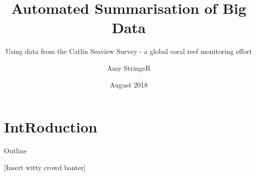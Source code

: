 \documentclass{beamer}
\title{Automated Summarisation of Big Data}
\subtitle{Using data from the Catlin Seaview Survey - a global coral reef monitoring effort}
\author{Amy StringeR}
\institute[Global Change Institute]
{
  \inst{1}%
  University of Queensland
}
\date{August 2018}
\begin{document}
    \section{IntRoduction}
        \begin{frame}
          \titlepage
        \end{frame}

        \begin{frame}{Outline}
          \tableofcontents
        \end{frame}

        \begin{frame}
          \begin{block}{[Insert witty crowd banter]}
          \end{block}
        \end{frame}

\end{document}
